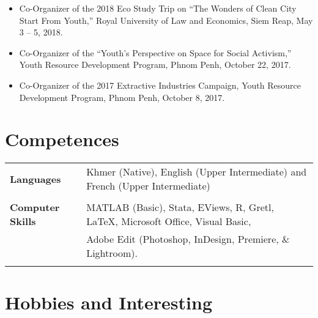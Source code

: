 \documentclass[10pt,a4paper]{article}
\begin{document}
\begin{adjustwidth}{.7cm}{}
\begin{itemize}[label={},itemindent=-2em,leftmargin=2em]
				\item Co-Organizer of the 2018 Eco Study Trip on “The Wonders of Clean City Start From Youth,'' Royal University of Law and Economics, Siem Reap, May 3 -- 5, 2018.
				
				\item Co-Organizer of the “Youth's Perspective on Space for Social Activism,” Youth Resource Development Program, Phnom Penh, October 22, 2017.
				
				\item Co-Organizer of the 2017 Extractive Industries Campaign, Youth Resource Development Program, Phnom Penh, October 8, 2017.				
			\end{itemize}
		\end{adjustwidth}
		\vspace{-1em}

\section*{Competences}
		\vspace{0em}
		\noindent \begin{tabular}{@{} l l}

			\hspace{2em}	\textbf{Languages} & Khmer (Native), English (Upper Intermediate) and French (Upper Intermediate)\\ 
			& \\
									
			\hspace{2em}	\textbf{Computer Skills} & MATLAB (Basic), Stata, EViews, R, Gretl, \LaTeX, Microsoft Office, Visual Basic, \\
			& Adobe Edit (Photoshop, InDesign, Premiere, \& Lightroom). \\ 
			& \\

		\end{tabular}
		\vspace{-1.5em}
\section*{Hobbies and Interesting}
	\vspace{0em}
	
\end{document}
